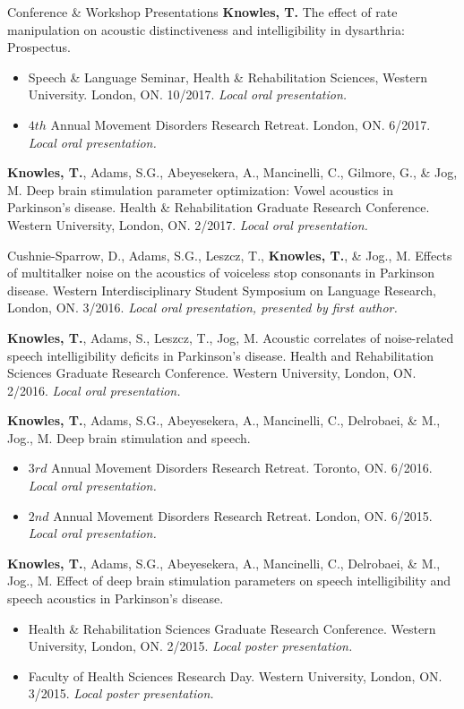 \documentclass{resume} %
\begin{document}
\begin{rSection}{Conference \& Workshop Presentations}
	{\bf Knowles, T.} The effect of rate manipulation on acoustic distinctiveness and intelligibility in dysarthria: Prospectus. 
	\begin{itemize}
		\renewcommand\labelitemi{$\cdot$}
		\item Speech \& Language Seminar, Health \& Rehabilitation Sciences, Western University. London, ON. 10/2017. \emph{Local oral presentation.}
		\item $4th$ Annual Movement Disorders Research Retreat. London, ON. 6/2017. \emph{Local oral presentation.}
	\end{itemize}
	
	
	{\bf Knowles, T.}, Adams, S.G., Abeyesekera, A., Mancinelli, C., Gilmore, G., \& Jog, M. Deep brain stimulation parameter optimization: Vowel acoustics in Parkinson's disease. Health \& Rehabilitation Graduate Research Conference. Western University, London, ON. 2/2017. \emph{Local oral presentation.}

	Cushnie-Sparrow, D., Adams, S.G., Leszcz, T., {\bf Knowles, T.},  \& Jog., M. Effects of multitalker noise on the acoustics of voiceless stop consonants in Parkinson disease. Western Interdisciplinary Student Symposium on Language Research, London, ON. 3/2016. \emph{Local oral presentation, presented by first author.}

	{\bf Knowles, T.}, Adams, S., Leszcz, T., Jog, M. Acoustic correlates of noise-related speech intelligibility deficits in Parkinson's disease. Health and Rehabilitation Sciences Graduate Research Conference. Western University, London, ON. 2/2016. \emph{Local oral presentation.}
	
	{\bf Knowles, T.}, Adams, S.G., Abeyesekera, A., Mancinelli, C., Delrobaei, \& M., Jog., M. Deep brain stimulation and speech.
	\begin{itemize}
				\renewcommand\labelitemi{$\cdot$}
		\item $3rd$ Annual Movement Disorders Research Retreat. Toronto, ON. 6/2016.  \emph{Local oral presentation.}
		\item $2nd$ Annual Movement Disorders Research Retreat. London, ON. 6/2015.  \emph{Local oral presentation.}
	\end{itemize}
	
	{\bf Knowles, T.}, Adams, S.G., Abeyesekera, A., Mancinelli, C., Delrobaei, \& M., Jog., M. Effect of deep brain stimulation parameters on speech intelligibility and speech acoustics in Parkinson's disease. 
	\begin{itemize}
				\renewcommand\labelitemi{$\cdot$}
		\item Health \& Rehabilitation Sciences Graduate Research Conference. Western University, London, ON.  2/2015.  \emph{Local poster presentation.}
		\item Faculty of Health Sciences Research Day. Western University, London, ON. 3/2015.  \emph{Local poster presentation.}
	\end{itemize}
	

\end{rSection}
\end{document}
